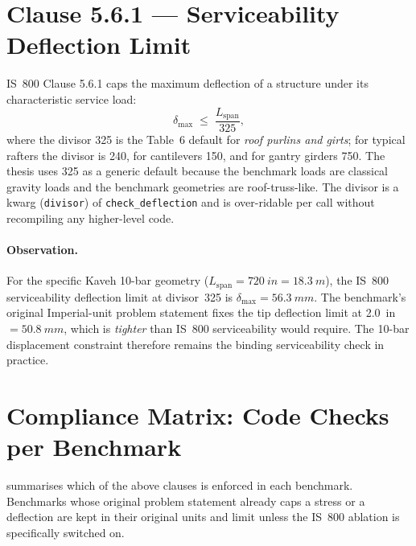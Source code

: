 \section{Clause 5.6.1 --- Serviceability Deflection Limit}
\label{app:is800:clause5_6_1}

IS~800 Clause 5.6.1 caps the maximum deflection of a structure
under its characteristic service load:
\begin{equation}
  \delta_{\max} \;\le\; \frac{L_{\mathrm{span}}}{325},
  \label{eq:is800:deflection}
\end{equation}
where the divisor \num{325} is the Table~6 default for
\emph{roof purlins and girts}; for typical rafters the divisor is
\num{240}, for cantilevers \num{150}, and for gantry girders
\num{750}. The thesis uses \num{325} as a generic default
because the benchmark loads are classical gravity loads and the
benchmark geometries are roof-truss-like. The divisor is a kwarg
(\texttt{divisor}) of \texttt{check\_deflection} and is over-ridable
per call without recompiling any higher-level code.

\paragraph{Observation.} For the specific Kaveh 10-bar geometry
($L_{\mathrm{span}}=\SI{720}{in}=\SI{18.3}{m}$), the IS~800
serviceability deflection limit at divisor~\num{325} is
$\delta_{\max}=\SI{56.3}{mm}$. The benchmark's original
Imperial-unit problem statement fixes the tip deflection limit
at \num{2.0}~in $=\SI{50.8}{mm}$, which is \emph{tighter} than
IS~800 serviceability would require. The 10-bar displacement
constraint therefore remains the binding serviceability check
in practice.

\section{Compliance Matrix: Code Checks per Benchmark}
\label{app:is800:matrix}

 summarises which of the above clauses is
enforced in each benchmark. Benchmarks whose original problem
statement already caps a stress or a deflection are kept in their
original units and limit unless the IS~800 ablation is
specifically switched on.

